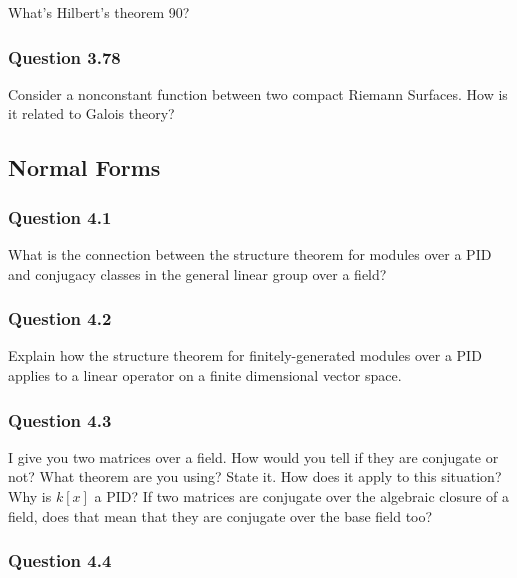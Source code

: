 What's Hilbert's theorem 90?

\hypertarget{question-3.78}{%
\subsubsection{Question 3.78}\label{question-3.78}}

Consider a nonconstant function between two compact Riemann Surfaces.
How is it related to Galois theory?

\hypertarget{normal-forms}{%
\subsection{Normal Forms}\label{normal-forms}}

\hypertarget{question-4.1}{%
\subsubsection{Question 4.1}\label{question-4.1}}

What is the connection between the structure theorem for modules over a
PID and conjugacy classes in the general linear group over a field?

\hypertarget{question-4.2}{%
\subsubsection{Question 4.2}\label{question-4.2}}

Explain how the structure theorem for finitely-generated modules over a
PID applies to a linear operator on a finite dimensional vector space.

\hypertarget{question-4.3}{%
\subsubsection{Question 4.3}\label{question-4.3}}

I give you two matrices over a field. How would you tell if they are
conjugate or not? What theorem are you using? State it. How does it
apply to this situation? Why is \(k[x]\) a PID? If two matrices are
conjugate over the algebraic closure of a field, does that mean that
they are conjugate over the base field too?

\hypertarget{question-4.4}{%
\subsubsection{Question 4.4}\label{question-4.4}}

